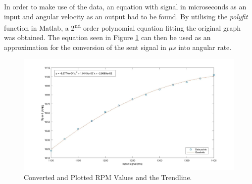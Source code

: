 In order to make use of the data, an equation with signal in microseconds as an input and angular velocity as an output had to be found. By utilising the \textit{polyfit} function in Matlab, a 2\textsuperscript{nd} order polynomial equation fitting the original graph was obtained. The equation seen in Figure \ref{RadsTrendline} can then be used as an approximation for the conversion of the sent signal in $\mu s$ into angular rate.
\begin{figure}[H]
  \centering
    \includegraphics[width=1\textwidth]{images/mstorpm.jpg}
	\caption{Converted and Plotted RPM Values and the Trendline.}
	\label{RadsTrendline}
\end{figure}

